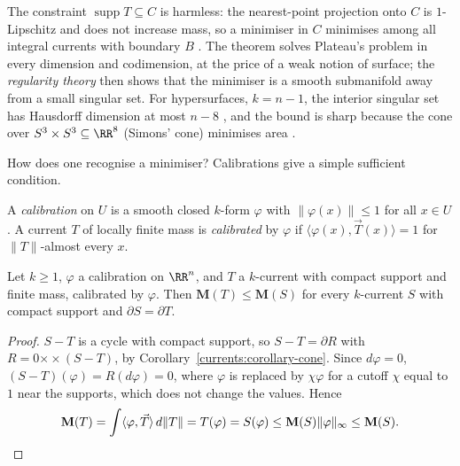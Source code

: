 The constraint $\operatorname{supp}T \subseteq C$ is harmless: the nearest-point projection onto $C$ is $1$-Lipschitz and does not increase mass, so a minimiser in $C$ minimises among all integral currents with
boundary $B$ \cite{federer-gmt}. The theorem solves Plateau's problem in every dimension and codimension, at the price of a weak notion of surface; the \emph{regularity theory} then shows that the
minimiser is a smooth submanifold away from a small singular set. For hypersurfaces, $k = n - 1$, the interior singular set has Hausdorff dimension at most $n - 8$ \cite{simon-gmt}, and the bound is sharp
because the cone over $S^3 \times S^3 \subseteq \RR^8$ (Simons' cone) minimises area \cite{bombieri-de-giorgi-giusti-1969}.

How does one recognise a minimiser? Calibrations give a simple sufficient condition.

\begin{definition}\label{currents:definition-calibration}
A \emph{calibration} on $U$ is a smooth closed $k$-form $\varphi$ with $\|\varphi(x)\| \leq 1$ for all $x \in U$. A current $T$ of locally finite mass is \emph{calibrated} by $\varphi$ if $\langle\varphi(x), \vec{T}(x)\rangle = 1$ for
$\|T\|$-almost every $x$.
\end{definition}

\begin{theorem}\label{currents:theorem-calibration}
Let $k \geq 1$, $\varphi$ a calibration on $\RR^n$, and $T$ a $k$-current with compact support and finite mass, calibrated by $\varphi$. Then $\mathbf{M}(T) \leq \mathbf{M}(S)$ for every $k$-current $S$ with compact support and
$\partial S = \partial T$.
\end{theorem}

\begin{proof}
$S - T$ is a cycle with compact support, so $S - T = \partial R$ with $R = 0 \mathbin{\times\!\!\!\!\times}(S - T)$, by Corollary~\ref{currents:corollary-cone}. Since $d\varphi = 0$, $(S - T)(\varphi) = R(d\varphi) = 0$, where $\varphi$ is replaced by $\chi\varphi$ for a cutoff $\chi$ equal to $1$ near the supports, which does not change the
values. Hence
\[
\mathbf{M}(T) = \int\langle\varphi, \vec{T}\rangle\,d\|T\| = T(\varphi) = S(\varphi) \leq \mathbf{M}(S)\|\varphi\|_\infty \leq \mathbf{M}(S). \qedhere
\]
\end{proof}

